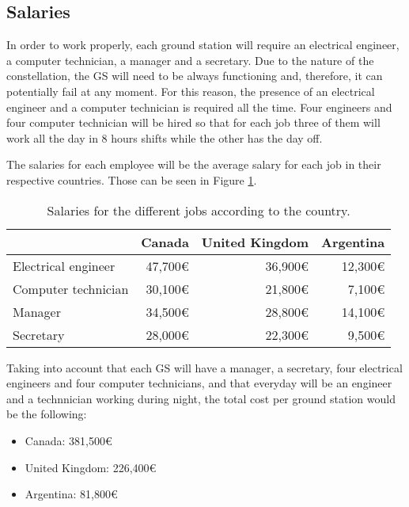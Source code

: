 \subsection{Salaries}
In order to work properly, each ground station will require an electrical engineer, a computer technician, a manager and a secretary. Due to the nature of the constellation, the GS will need to be always functioning and, therefore, it can potentially fail at any moment. For this reason, the presence of an electrical engineer and a computer technician is required all the time. Four engineers and four computer technician will be hired so that for each job three of them will work all the day in 8 hours shifts while the other has the day off.

The salaries for each employee will be the average salary for each job in their respective countries. Those can be seen in Figure \ref{table:Salaries}.
\begin{table}[H]
\begin{center}
\begin{tabular}{|l|r|r|r|}
\hline 
 & Canada & United Kingdom & Argentina \\ 
\hline 
Electrical engineer & 47,700\euro & 36,900\euro & 12,300\euro \\ 
\hline 
Computer technician & 30,100\euro & 21,800\euro & 7,100\euro \\ 
\hline 
Manager & 34,500\euro & 28,800\euro & 14,100\euro \\ 
\hline 
Secretary & 28,000\euro & 22,300\euro & 9,500\euro \\ 
\hline 
\end{tabular}
\end{center}
\caption[Salaries according to country]{Salaries for the different jobs according to the country.}
\label{table:Salaries}
\end{table}

Taking into account that each GS will have a manager, a secretary, four electrical engineers and four computer technicians, and that everyday will be an engineer and a technnician working during night, the total cost per ground station would be the following:
\begin{itemize}
\item Canada: 381,500\euro
\item United Kingdom: 226,400\euro
\item Argentina: 81,800\euro
\end{itemize}

